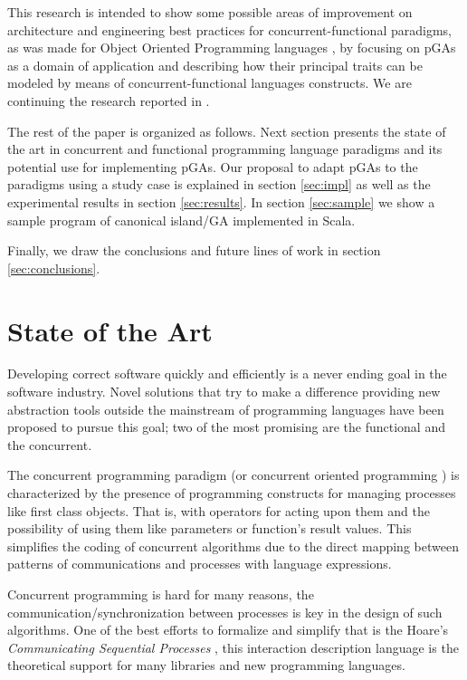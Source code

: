 \documentclass[sigconf]{acmart}
\begin{document}
This research is intended to show some possible areas of improvement on architecture and engineering best practices for concurrent-functional paradigms, as was made for Object Oriented Programming languages \cite{EO:FEA2000}, by focusing on pGAs as a domain of application and describing how their principal traits can be modeled by means of concurrent-functional languages constructs. We are continuing the research reported in \cite{DBLP:conf/gecco/CruzGGC13,J.Albert-Cruz2013}.

The rest of the paper is organized as follows. Next section presents the state of the art in concurrent and functional programming language paradigms and its potential use for implementing pGAs. Our proposal to adapt pGAs to the paradigms using a study case is explained in section \ref{sec:impl} as well as the experimental results in section \ref{sec:results}. In section \ref{sec:sample} we show a sample program of canonical island/GA implemented in Scala.

Finally, we draw the conclusions and future lines of work in section \ref{sec:conclusions}.


\section{State of the Art}
\noindent Developing correct software quickly and efficiently is a
never ending goal in the software industry. Novel solutions that try
to make a difference providing new abstraction tools outside the
mainstream of programming languages have been proposed to pursue this
goal; two of the most promising are the functional and the concurrent.

The concurrent programming paradigm (or concurrent oriented programming \cite{Armstrong2003}) is characterized by the presence of programming constructs for managing processes like first class objects. That is, with operators for acting upon them and the possibility of using them like parameters or function's result values. This simplifies the coding of concurrent algorithms due to the direct mapping between patterns of communications and processes with language expressions.

Concurrent programming is hard for many reasons, the communication/synchronization between processes is key in the design of such algorithms. One of the best efforts to formalize and simplify that is the Hoare’s {\em Communicating Sequential Processes} \cite{Hoare:1978:CSP:359576.359585}, this interaction description language is the theoretical support for many libraries and new programming languages.
\end{document}
